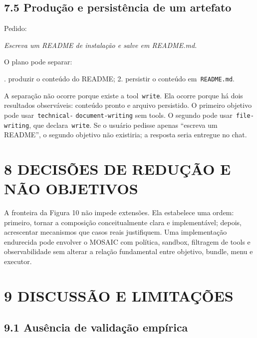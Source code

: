 \documentclass[12pt,a4paper]{article}
\begin{document}

\subsection*{7.5 Produção e persistência de um artefato}

Pedido:


\textit{Escreva um README de instalação e salve em README.md.}


O plano pode separar:


. produzir o conteúdo do README; 2. persistir o conteúdo em\texttt{ README.md}.\par

A separação não ocorre porque existe a tool\texttt{ write}. Ela ocorre porque há dois resultados observáveis: conteúdo pronto e arquivo persistido. O primeiro objetivo pode usar\texttt{ technical-} \texttt{document-writing} sem tools. O segundo pode usar\texttt{ file-writing}, que declara\texttt{ write}. Se o usuário pedisse apenas “escreva um README”, o segundo objetivo não existiria; a resposta seria entregue no chat.


\section*{8 DECISÕES DE REDUÇÃO E NÃO OBJETIVOS}






A fronteira da Figura 10 não impede extensões. Ela estabelece uma ordem: primeiro, tornar a composição conceitualmente clara e implementável; depois, acrescentar mecanismos que casos reais justifiquem. Uma implementação endurecida pode envolver o MOSAIC com política, sandbox, filtragem de tools e observabilidade sem alterar a relação fundamental entre objetivo, bundle, menu e executor.



\section*{9 DISCUSSÃO E LIMITAÇÕES}

\subsection*{9.1 Ausência de validação empírica}
\end{document}
